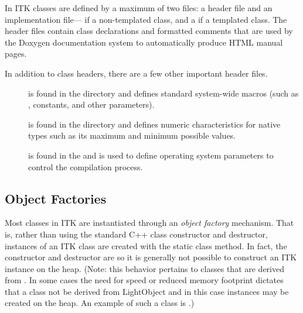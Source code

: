In ITK classes are defined by a maximum of two files: a header  file
and an implementation file--- if a non-templated class, and a
 if a templated class.
The header files contain class declarations
and formatted comments that are used by the Doxygen documentation
system to automatically produce HTML manual pages.

In addition to class headers, there are a few other important header files.
\begin{description}
        \item[] is found in the  directory
        and defines standard system-wide macros (such as ,
        constants, and other parameters).

        \item[] is found in the  
        directory and defines numeric characteristics for native types such
        as its maximum and minimum possible values.

        \item[] is found in the  
        and is used to define operating system parameters to control
        the compilation process.
\end{description}

\subsection{Object Factories}
\label{sec:ObjectFactories}


Most classes in ITK are instantiated through an \emph{object factory}
mechanism. That is, rather than using the standard C++ class constructor and
destructor, instances of an ITK class are created with the static class
 method. In fact, the constructor and destructor are
 so it is generally not possible to construct an ITK
instance on the heap. (Note: this behavior pertains to classes that are
derived from . In some cases the need for speed or
reduced memory footprint dictates that a class not be derived from
LightObject and in this case instances may be created on the heap. An
example of such a class is .)

